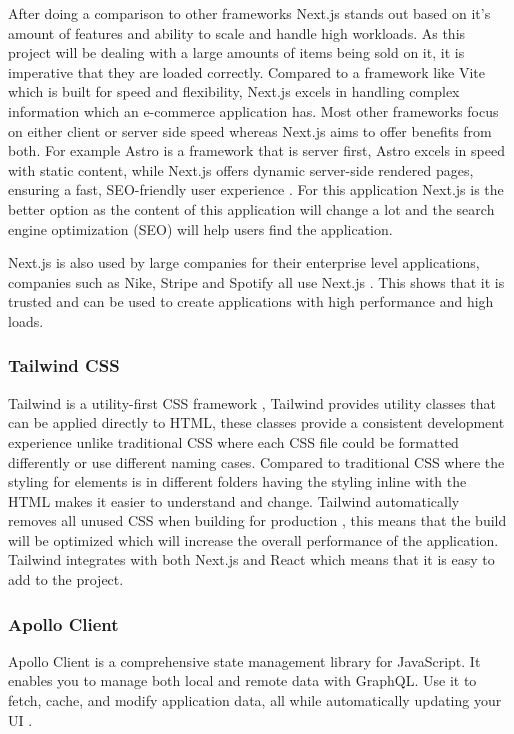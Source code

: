 \documentclass[]{project_report}
\begin{document}
After doing a comparison to other frameworks Next.js stands out based on it's amount of features and ability to scale and handle high workloads. As this project will be dealing with a large amounts of items being sold on it, it is imperative that they are loaded correctly. Compared to a framework like Vite which is built for speed and flexibility, Next.js  excels in handling complex information which an e-commerce application has. Most other frameworks focus on either client or server side speed whereas Next.js aims to offer benefits from both. For example Astro is a framework that is server first, Astro excels in speed with static content, while Next.js offers dynamic server-side rendered pages, ensuring a fast, SEO-friendly user experience \cite{astro_nextjs}. For this application Next.js is the better option as the content of this application will change a lot and the search engine optimization (SEO) will help users find the application. 

Next.js is also used by large companies for their enterprise level applications, companies such as Nike, Stripe and Spotify all use Next.js \cite{nextjs_showcase}. This shows that it is trusted and can be used to create applications with high performance and high loads.

\subsubsection{Tailwind CSS}

Tailwind is a utility-first CSS framework \cite{tailwindcss}, Tailwind provides utility classes that can be applied directly to HTML, these classes provide a consistent development experience unlike traditional CSS where each CSS file could be formatted differently or use different naming cases. Compared to traditional CSS where the styling for elements is in different folders having the styling inline with the HTML makes it easier to understand and change. Tailwind automatically removes all unused CSS when building for production \cite{tailwindcss}, this means that the build will be optimized which will increase the overall performance of the application. Tailwind integrates with both Next.js and React which means that it is easy to add to the project. 

\subsubsection{Apollo Client}

Apollo Client is a comprehensive state management library for JavaScript. It enables you to manage both local and remote data with GraphQL. Use it to fetch, cache, and modify application data, all while automatically updating your UI \cite{apollo_client}. 
\end{document}
